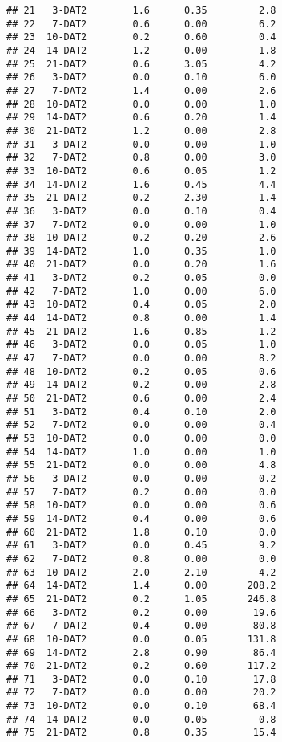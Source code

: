 \documentclass[
]{article}
\begin{document}
\begin{verbatim}
## 21   3-DAT2        1.6      0.35         2.8
## 22   7-DAT2        0.6      0.00         6.2
## 23  10-DAT2        0.2      0.60         0.4
## 24  14-DAT2        1.2      0.00         1.8
## 25  21-DAT2        0.6      3.05         4.2
## 26   3-DAT2        0.0      0.10         6.0
## 27   7-DAT2        1.4      0.00         2.6
## 28  10-DAT2        0.0      0.00         1.0
## 29  14-DAT2        0.6      0.20         1.4
## 30  21-DAT2        1.2      0.00         2.8
## 31   3-DAT2        0.0      0.00         1.0
## 32   7-DAT2        0.8      0.00         3.0
## 33  10-DAT2        0.6      0.05         1.2
## 34  14-DAT2        1.6      0.45         4.4
## 35  21-DAT2        0.2      2.30         1.4
## 36   3-DAT2        0.0      0.10         0.4
## 37   7-DAT2        0.0      0.00         1.0
## 38  10-DAT2        0.2      0.20         2.6
## 39  14-DAT2        1.0      0.35         1.0
## 40  21-DAT2        0.0      0.20         1.6
## 41   3-DAT2        0.2      0.05         0.0
## 42   7-DAT2        1.0      0.00         6.0
## 43  10-DAT2        0.4      0.05         2.0
## 44  14-DAT2        0.8      0.00         1.4
## 45  21-DAT2        1.6      0.85         1.2
## 46   3-DAT2        0.0      0.05         1.0
## 47   7-DAT2        0.0      0.00         8.2
## 48  10-DAT2        0.2      0.05         0.6
## 49  14-DAT2        0.2      0.00         2.8
## 50  21-DAT2        0.6      0.00         2.4
## 51   3-DAT2        0.4      0.10         2.0
## 52   7-DAT2        0.0      0.00         0.4
## 53  10-DAT2        0.0      0.00         0.0
## 54  14-DAT2        1.0      0.00         1.0
## 55  21-DAT2        0.0      0.00         4.8
## 56   3-DAT2        0.0      0.00         0.2
## 57   7-DAT2        0.2      0.00         0.0
## 58  10-DAT2        0.0      0.00         0.6
## 59  14-DAT2        0.4      0.00         0.6
## 60  21-DAT2        1.8      0.10         0.0
## 61   3-DAT2        0.0      0.45         9.2
## 62   7-DAT2        0.8      0.00         0.0
## 63  10-DAT2        2.0      2.10         4.2
## 64  14-DAT2        1.4      0.00       208.2
## 65  21-DAT2        0.2      1.05       246.8
## 66   3-DAT2        0.2      0.00        19.6
## 67   7-DAT2        0.4      0.00        80.8
## 68  10-DAT2        0.0      0.05       131.8
## 69  14-DAT2        2.8      0.90        86.4
## 70  21-DAT2        0.2      0.60       117.2
## 71   3-DAT2        0.0      0.10        17.8
## 72   7-DAT2        0.0      0.00        20.2
## 73  10-DAT2        0.0      0.10        68.4
## 74  14-DAT2        0.0      0.05         0.8
## 75  21-DAT2        0.8      0.35        15.4

\end{verbatim}
\end{document}
